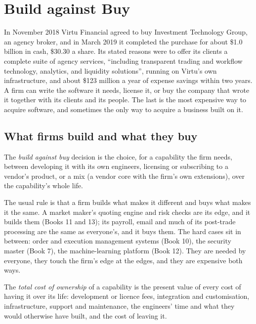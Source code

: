 \chapter{Build against Buy}\label{ch:fm:build-against-buy}

In November 2018 Virtu Financial agreed to buy Investment Technology Group, an agency broker, and in March 2019 it completed the purchase for about
\$1.0 billion in cash, \$30.30 a share. Its stated reasons were to offer its clients a complete suite of agency services, ``including transparent
trading and workflow technology, analytics, and liquidity solutions'', running on Virtu's own infrastructure, and about \$123 million a year of
expense savings within two years. A firm can write the software it needs, license it, or buy the company that wrote it together with its clients
and its people. The last is the most expensive way to acquire software, and sometimes the only way to acquire a business built on it.

\section{What firms build and what they buy}

\begin{definition}\label{def:fm:build-against-buy:bab}
The \emph{build against buy} decision is the choice, for a capability the firm needs, between developing it with its own
engineers, licensing or subscribing to a vendor's product, or a mix (a vendor core with the firm's own extensions), over the capability's whole
life.
\end{definition}

The usual rule is that a firm builds what makes it different and buys what makes it the same. A market maker's quoting engine and risk checks are
its edge, and it builds them (Books 11 and 13); its payroll, email and much of its post-trade processing are the same as everyone's, and it buys
them. The hard cases sit in between: order and execution management systems (Book 10), the security master (Book 7), the machine-learning
platform (Book 12). They are needed by everyone, they touch the firm's edge at the edges, and they are expensive both ways.

\begin{definition}\label{def:fm:build-against-buy:tco}
The \emph{total cost of ownership} of a capability is the present value of every cost of having it over its life:
development or licence fees, integration and customisation, infrastructure, support and maintenance, the engineers' time and what they would
otherwise have built, and the cost of leaving it.
\end{definition}

